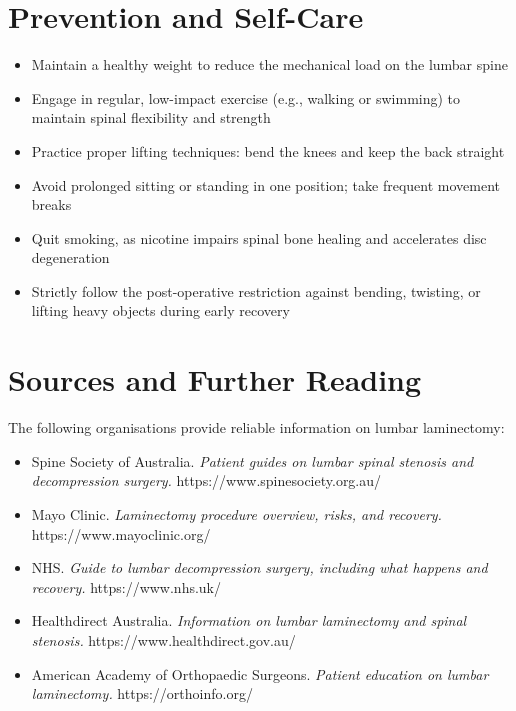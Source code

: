 \section*{Prevention and Self-Care}
\begin{itemize}
    \item Maintain a healthy weight to reduce the mechanical load on the lumbar spine
    \item Engage in regular, low-impact exercise (e.g., walking or swimming) to maintain spinal flexibility and strength
    \item Practice proper lifting techniques: bend the knees and keep the back straight
    \item Avoid prolonged sitting or standing in one position; take frequent movement breaks
    \item Quit smoking, as nicotine impairs spinal bone healing and accelerates disc degeneration
    \item Strictly follow the post-operative restriction against bending, twisting, or lifting heavy objects during early recovery
\end{itemize}

\section*{Sources and Further Reading}
The following organisations provide reliable information on lumbar laminectomy:

\begin{itemize}
    \item Spine Society of Australia. \textit{Patient guides on lumbar spinal stenosis and decompression surgery.} https://www.spinesociety.org.au/
    \item Mayo Clinic. \textit{Laminectomy procedure overview, risks, and recovery.} https://www.mayoclinic.org/
    \item NHS. \textit{Guide to lumbar decompression surgery, including what happens and recovery.} https://www.nhs.uk/
    \item Healthdirect Australia. \textit{Information on lumbar laminectomy and spinal stenosis.} https://www.healthdirect.gov.au/
    \item American Academy of Orthopaedic Surgeons. \textit{Patient education on lumbar laminectomy.} https://orthoinfo.org/
\end{itemize}
